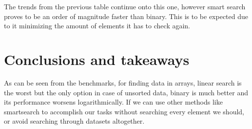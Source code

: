 \documentclass[a4paper,11pt]{article}
\begin{document}
The trends from the previous table continue onto this one, however smart search proves to be an order of magnitude faster than binary. This is to be expected due to it minimizing the amount of elements it has to check again. 


\section*{Conclusions and takeaways}

As can be seen from the benchmarks, for finding data in arrays, linear search is the worst but the only option in case of unsorted data, binary is much better and its performance worsens logarithmically. If we can use other methods like smartsearch to accomplish our tasks without searching every element we should, or avoid searching through datasets altogether.
\end{document}

